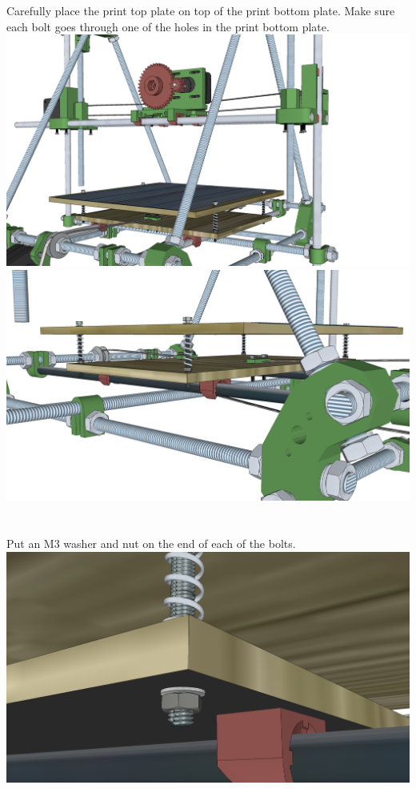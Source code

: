 \documentclass[twoside,a4paper,titlepage]{memoir}
\begin{document}
	\section{}
	Carefully place the print top plate on top of the print bottom plate. Make sure each bolt goes through
	one of the holes in the print bottom plate.\\
	\includegraphics[width=1\linewidth]{graphics/ch11_6_1.png}
	\includegraphics[width=1\linewidth]{graphics/ch11_6_2.png}
	
	\section{}
	Put an M3 washer and nut on the end of each of the bolts.\\
	\includegraphics[width=1\linewidth]{graphics/ch11_7.png}
	
\end{document}
